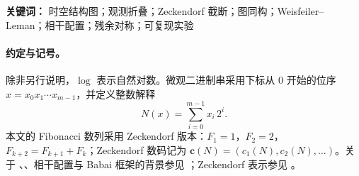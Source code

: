 
\begin{abstract}
本文提出一套以 Zeckendorf 截断折叠为规范（canonical folding）的时空结构图接口：把微观态空间 $X$、宏观观测空间 $Z$、折叠算子 $f:X\to Z$、空间关系与时间关系统一编码为一个带颜色的组合对象，使其可直接接入 Babai 的 \WL{} / 相干配置框架。该接口将“观测导致的信息压缩”表述为由 $f$ 诱导的块系统，并将纤维 $f^{-1}(z)$ 的内部自由度解释为可计算的“时间/复杂度”坐标。\par
在规范体系下，我们给出结构同构与编码图同构的等价翻译定理，并给出可复现实验指标：\WL{} 稳定深度、残余轨道规模与纤维统计量，从而为“带时空语义的离散对象”接入 Babai--\WL{}--相干配置框架提供一个可审计的最小接口。
\end{abstract}

\begin{sloppypar}
\textbf{关键词：} 时空结构图；观测折叠；Zeckendorf 截断；图同构；Weisfeiler--Leman；相干配置；残余对称；可复现实验
\end{sloppypar}

\paragraph{约定与记号。}
除非另行说明，$\log$ 表示自然对数。微观二进制串采用下标从 $0$ 开始的位序 $x=x_0x_1\cdots x_{m-1}$，并定义整数解释
$$
N(x)=\sum_{i=0}^{m-1} x_i\,2^i.
$$
本文的 Fibonacci 数列采用 Zeckendorf 版本：$F_1=1$，$F_2=2$，$F_{k+2}=F_{k+1}+F_k$；Zeckendorf 数码记为 $\mathbf c(N)=(c_1(N),c_2(N),\dots)$。关于 \GI{}、\WL{}、相干配置与 Babai 框架的背景参见 \cite{babai2016gi,wl2018symmetryvsregularity,ivanov2013coherent}；Zeckendorf 表示参见 \cite{zeckendorf1972representation}。

